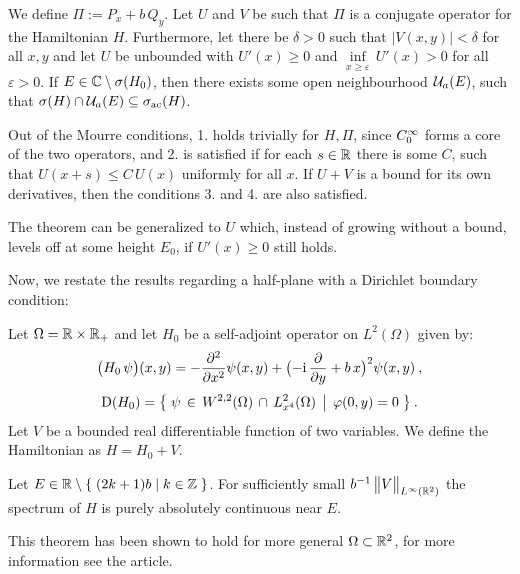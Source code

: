 \begin{thm}
    We define $\mathit\Pi := P_x + b \, Q_y$. Let $U$ and $V$ be such that $\mathit\Pi$ is a conjugate operator for the Hamiltonian $H$. Furthermore, let there be $\delta>0$ such that $|V(x,y)|<\delta$ for all $x,y$ and let $U$ be unbounded with $U'(x) \geq 0$ and $\underset{x\geq\varepsilon}{\inf} \, U'(x) > 0$ for all $\varepsilon>0$. If $E \in \mathbb{C} \setminus \sigma(H_0)$, then there exists some open neighbourhood $\mathcal{U}_a(E)$, such that $\sigma(H) \cap \mathcal{U}_a(E) \subseteq \sigma_{\mathrm{ac}}(H)$.
\end{thm}

\begin{lemma}
    Out of the Mourre conditions, 1. holds trivially for $H, \mathit\Pi$, since $C_0^\infty$ forms a core of the two operators, and 2. is satisfied if for each $s\in\mathbb{R}$ there is some $C$, such that $U(x+s) \leq C \, U(x)$ uniformly for all $x$. If $U+V$ is a bound for its own derivatives, then the conditions 3. and 4. are also satisfied.
\end{lemma}

\begin{lemma}
    The theorem can be generalized to $U$ which, instead of growing without a bound, levels off at some height $E_0$, if $U'(x)\geq 0$ still holds.
\end{lemma}

Now, we restate the results regarding a half-plane with a Dirichlet boundary condition:

\begin{defn}
    \label{defn-hamiltonian-dirichlet}
    Let $\Omega=\mathbb{R}\times\mathbb{R}_+$ and let $H_0$ be a self-adjoint operator on $L^2(\Omega)$ given by:
    \begin{gather*}
        \big( H_0 \, \psi \big)(x, y)
        = -\frac{\partial ^2}{\partial x^2} \psi(x, y)
        + \big( {-\mathrm{i}} \, \frac{\partial }{\partial y} + b \, x \big)^2 \psi(x, y)
        \: ,
        \\[3pt]
        \mathrm{D}(H_0)
        = \big\{
            \;
            \psi \,\in\, W^{2,2}(\Omega)
            \,\cap\, L^2_{x^4}(\Omega)
            \;\, \big| \;\,
            \varphi(0, y) = 0
            \;
        \big\}
        \: .
    \end{gather*}
    Let $V$ be a bounded real differentiable function of two variables. We define the Hamiltonian as $H = H_0 + V$.
\end{defn}
\begin{thm}
    Let $E \in \mathbb{R} \setminus \{ \; (2k+1)b \;|\; k \in \mathbb{Z} \;\}$. For sufficiently small $b^{-1} \, \big\lVert V \big\rVert_{L^\infty(\mathbb{R}^2)}$ the spectrum of $H$ is purely absolutely continuous near $E$.
\end{thm}
\noindent This theorem has been shown to hold for more general $\Omega \subset \mathbb{R}^2$, for more information see the article.


